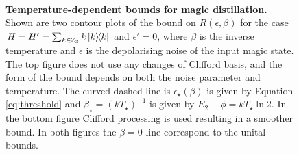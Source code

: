 \documentclass[pra,
aps,
twocolumn,
superscriptaddress,
groupedaddress,
nofootinbib,
reprint
]{revtex4-1}
\begin{document}
\begin{figure}[t!]
    \centering
    \\
    \caption{\textbf{Temperature-dependent bounds for magic distillation.} Shown are two contour plots of the bound on $R(\epsilon, \beta)$ for the case $H = H' = \sum_{k \in \mathbb{Z}_3} k \ketbra{k}$ and $\epsilon' = 0$, where $\beta$ is the inverse temperature and $\epsilon$ is the depolarising noise of the input magic state. 
The top figure  does not use any changes of Clifford basis, and the form of the bound depends on both the noise parameter and temperature. The curved dashed line is $\epsilon_\star(\beta)$ is given by Equation \ref{eq:threshold} and $\beta_\star = (kT_\star)^{-1}$ is given by $E_2-\phi = kT_\star \ln 2$. 
In the bottom figure  Clifford processing is used resulting in a smoother bound. In both figures the $\beta = 0$ line correspond to the unital bounds.}
    \label{fig:rate_contour}
\end{figure}
\end{document}
